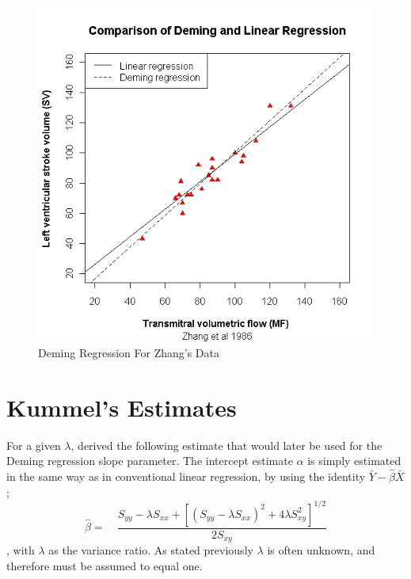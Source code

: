 \documentclass[12pt, a4paper]{report}
\theoremstyle{plain}
\theoremstyle{definition}
\theoremstyle{remark}
\begin{document}
\begin{figure}[h!]
	\includegraphics[width=130mm]{images/ZhangDeming.jpeg}
	\caption{Deming Regression For Zhang's Data}\label{ZhangDeming}
\end{figure}


\newpage



\section{Kummel's Estimates}


For a given $\lambda$, \citet{Kummel} derived the following estimate that would later be used for the Deming regression slope
parameter. The intercept estimate $\alpha$ is simply estimated in the same way as in conventional linear
regression, by using the identity $\bar{Y}-\hat{\beta}\bar{X}$;
\begin{equation}
	\hat{\beta} =\quad \frac{S_{yy} - \lambda S_{xx}+[(S_{yy} -
		\lambda S_{xx})^{2}+ 4\lambda S^{2}_{xy}]^{1/2}}{2S_{xy}}
\end{equation},
with $\lambda$ as the variance ratio. As stated previously $\lambda$ is often unknown, and therefore must be assumed to equal one. 
\end{document}
